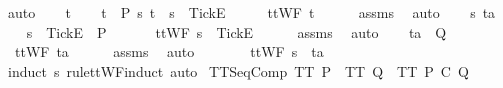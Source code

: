 \begin{isabellebody}
{\ auto\isanewline
\ \ \isamarkupfalse%
\ t\isanewline
\ \ \isamarkupfalse%
\ {\isachardoublequoteopen}t\ {\isasymin}\ P{\isachardoublequoteclose}\ {\isachardoublequoteopen}{\isasymforall}s{\isachardot}\ t\ {\isasymnoteq}\ s\ {\isacharat}\ {\isacharbrackleft}{\isacharbrackleft}Tick{\isacharbrackright}\isactrlsub E{\isacharbrackright}{\isachardoublequoteclose}\isanewline
\ \ \isamarkupfalse%
\ \isamarkupfalse%
\ {\isachardoublequoteopen}ttWF\ t{\isachardoublequoteclose}\isanewline
\ \ \ \ \isamarkupfalse%
\ assms{\isacharparenleft}{}{\isacharparenright}\ \isamarkupfalse%
\ auto\isanewline
{}\isamarkupfalse%
\isanewline
\ \ \isamarkupfalse%
\ s\ ta\isanewline
\ \ \isamarkupfalse%
\ {\isachardoublequoteopen}s\ {\isacharat}\ {\isacharbrackleft}{\isacharbrackleft}Tick{\isacharbrackright}\isactrlsub E{\isacharbrackright}\ {\isasymin}\ P{\isachardoublequoteclose}\isanewline
\ \ \isamarkupfalse%
\ \isamarkupfalse%
\ {}{\isacharcolon}\ {\isachardoublequoteopen}ttWF\ {\isacharparenleft}s\ {\isacharat}\ {\isacharbrackleft}{\isacharbrackleft}Tick{\isacharbrackright}\isactrlsub E{\isacharbrackright}{\isacharparenright}{\isachardoublequoteclose}\isanewline
\ \ \ \ \isamarkupfalse%
\ assms{\isacharparenleft}{}{\isacharparenright}\ \isamarkupfalse%
\ auto\isanewline
\ \ \isamarkupfalse%
\ {\isachardoublequoteopen}ta\ {\isasymin}\ Q{\isachardoublequoteclose}\isanewline
\ \ \isamarkupfalse%
\ \isamarkupfalse%
\ {}{\isacharcolon}\ {\isachardoublequoteopen}ttWF\ ta{\isachardoublequoteclose}\isanewline
\ \ \ \ \isamarkupfalse%
\ assms{\isacharparenleft}{}{\isacharparenright}\ \isamarkupfalse%
\ auto\isanewline
\ \ \isamarkupfalse%
\ {}\ {}\ \isamarkupfalse%
\ {\isachardoublequoteopen}ttWF\ {\isacharparenleft}s\ {\isacharat}\ ta{\isacharparenright}{\isachardoublequoteclose}\isanewline
\ \ \ \ \isamarkupfalse%
\ {\isacharparenleft}induct\ s\ rule{\isacharcolon}ttWF{\isachardot}induct{\isacharcomma}\ auto{\isacharparenright}\isanewline
{}\isamarkupfalse%
%
\endisatagproof
{\isafoldproof}%
%
\isadelimproof
%
\endisadelimproof
%
}%
\isamarkupfalse%
\ TT{}{\isacharunderscore}SeqComp{\isacharcolon}\ {\isachardoublequoteopen}TT{}\ P\ {\isasymLongrightarrow}\ TT{}\ Q\ {\isasymLongrightarrow}\ TT{}\ {\isacharparenleft}P\ {\isacharsemicolon}\isactrlsub C\ Q{\isacharparenright}{\isachardoublequoteclose}\isanewline

\end{isabellebody}
